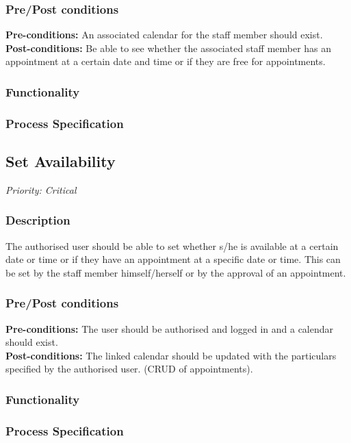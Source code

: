 	\subsubsection{Pre/Post conditions}
		\textbf{Pre-conditions:} An associated calendar for the staff member should exist.\\
		\textbf{Post-conditions:} Be able to see whether the associated staff member has an appointment at a certain date and time or if they are free for appointments. 
	\subsubsection{Functionality}
	\subsubsection{Process Specification}
	
\subsection{Set Availability}\hfill \textit{Priority: Critical} \\
	\subsubsection{Description}
	The authorised user should be able to set whether s/he is available at a certain date or time or if they have an appointment at a specific date or time. This can be set by the staff member himself/herself or by the approval of an appointment.\\
	\subsubsection{Pre/Post conditions}
		\textbf{Pre-conditions:} The user should be authorised and logged in and a calendar should exist.\\
		\textbf{Post-conditions:} The linked calendar should be updated with the particulars specified by the authorised user. (CRUD of appointments).
	\subsubsection{Functionality}
	\subsubsection{Process Specification}